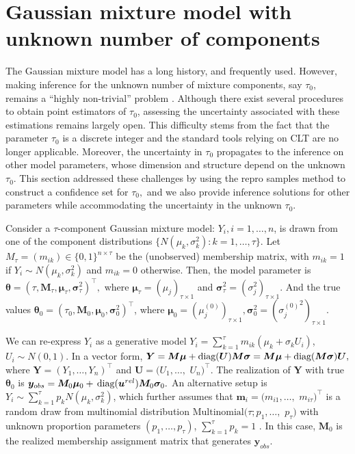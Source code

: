 \documentclass[12pt]{article}
\theoremstyle{shortspace}
\def\*#1{\bm{#1}}
\newcommand{\diag}{\hbox{diag}}
\begin{document}
\section{Gaussian mixture model with unknown number of components} 
\label{sec:mixture}

The Gaussian mixture model 
has a long history, 
and frequently used. 
However, 
making inference for the unknown number of mixture components, say $\tau_0$,  
remains  
a ``highly non-trivial'' problem \citep[cf.,][]{wasserman2020universal}.  
Although there exist several 
procedures to obtain point estimators of $\tau_0$, assessing the uncertainty associated with these estimations remains largely open.
This difficulty stems from the fact that the parameter $\tau_0$ is a discrete integer 
and the standard tools relying on CLT are no longer applicable.
Moreover, the uncertainty in $\tau_0$
 propagates to the inference on other model parameters, 
 whose dimension and structure depend on the unknown $\tau_0$.
 This section addressed these challenges by using the repro samples method to construct a confidence set for $\tau_0,$  and we also provide inference solutions for other parameters while 
accommodating the uncertainty in the unknown $\tau_0$. 

 


Consider a $\tau$-component Gaussian mixture model: $Y_i, i=1,\ldots,n$, 
is drawn from one of the component distributions $\{N(\mu_k,\sigma_k^2): k=1,\ldots,\tau\}.$
Let $M_\tau=(m_{ik})\in\{0,1\}^{n\times\tau}$ be the (unobserved) membership matrix, with
$m_{ik}=1$ if $Y_i \sim N(\mu_k,\sigma_k^2)$ and $m_{ik}=0$ otherwise. Then, the model parameter is $\*\theta=(\tau, \*M_\tau, {\*\mu}_\tau, {\*\sigma}_\tau^2)^\top,$
where ${\*\mu}_\tau=(\mu_j)_{\tau \times 1}$ and ${\*\sigma}_\tau^2=(\sigma_j^2)_{\tau \times 1}$. 
And the true values  $\*\theta_0=(\tau_0, \*M_0, {\*\mu}_0, {\*\sigma}_0^2)^\top$, where $\*\mu_0 = (\mu_j^{(0)})_{\tau \times 1}, {\*\sigma}_0^2 = ({\sigma_j^{(0)}}^2)_{\tau \times 1}. $




We can re-express $Y_i$ as a generative model $Y_i = \sum_{k =1}^\tau m_{ik} (\mu_k + \sigma_{k}U_{i})$, $U_i \sim N(0,1)$. In a vector form, ${\*Y} = {\*M} {\*\mu} + \diag(\*U)\*M  {\*\sigma} = {\*M} {\*\mu} + \diag(\*M {\*\sigma}) \*U,$ 
where ${\*Y} = (Y_1, \ldots, Y_n)^{\top}$ 
 and $\*U = (U_1, \ldots, $ $ U_n)^{\top}$. 
The realization %
of $\*Y$ with true $\*\theta_0$ is 
${\bm y_{obs}} = {\bm M}_{0} {\bm \mu}_{0} + \, \diag({\bm  u}^{rel}){\bm M}_{0} \*\sigma_0.$
An alternative  
setup is $Y_i \sim \sum_{k =1}^\tau p_{k} N(\mu_k, \sigma_k^2)$, which further assumes that ${\*m}_i= (m_{i1}, \ldots, $ $m_{i\tau})^{\top}$ is a random draw from multinomial distribution $\text{Multinomial}(\tau; p_1, \ldots,$ $ p_{\tau})$ with unknown proportion parameters $(p_1, \ldots, p_{\tau})$, $\sum_{k =1}^\tau p_k = 1$ \citep{chen_inference_2012}. 
In this case, 
$\*M_0$ is the realized membership assignment 
matrix that generates $\*y_{obs}$. 
\end{document}

